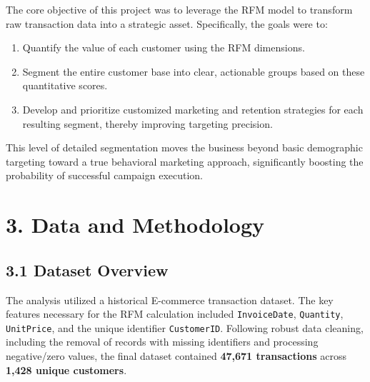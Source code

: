 \documentclass{article}
\begin{document}
The core objective of this project was to leverage the RFM model to transform raw transaction data into a strategic asset. Specifically, the goals were to:
\begin{enumerate}
    \item Quantify the value of each customer using the RFM dimensions.
    \item Segment the entire customer base into clear, actionable groups based on these quantitative scores.
    \item Develop and prioritize customized marketing and retention strategies for each resulting segment, thereby improving targeting precision.
\end{enumerate}
This level of detailed segmentation moves the business beyond basic demographic targeting toward a true behavioral marketing approach, significantly boosting the probability of successful campaign execution.

\section*{3. Data and Methodology}

\subsection*{3.1 Dataset Overview}
The analysis utilized a historical E-commerce transaction dataset. The key features necessary for the RFM calculation included \texttt{InvoiceDate}, \texttt{Quantity}, \texttt{UnitPrice}, and the unique identifier \texttt{CustomerID}. Following robust data cleaning, including the removal of records with missing identifiers and processing negative/zero values, the final dataset contained \textbf{47,671 transactions} across \textbf{1,428 unique customers}.
\end{document}
